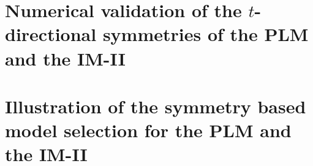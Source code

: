 \documentclass[12pt]{article}
\begin{document}


\section{Numerical validation of the $t$-directional  symmetries of the PLM and the IM-II}



\section{Illustration of the symmetry based model selection for the PLM and the IM-II}



\newpage
 


\end{document}

